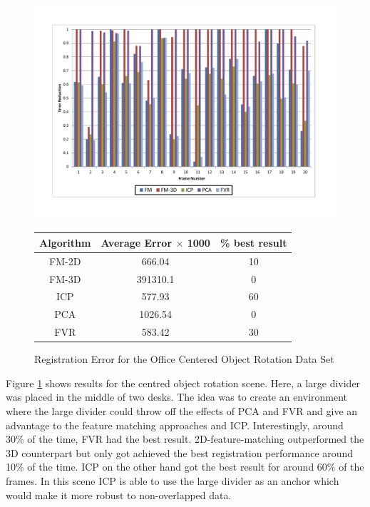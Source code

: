 \begin{figure}
\centering
\includegraphics[width=6in]{images/results/Office_Texture_blind_spot_rotation}
\caption{Registration Error for the Office Centered Object Rotation Data Set}
\label{fig:PET9}

\begin{tabular}{ccc}
\hline
\textbf{Algorithm} & \textbf{Average Error $\times$ 1000} & \textbf{\% best result}\\ \hline
FM-2D	& 666.04 & 10\\
FM-3D	& 391310.1 & 0\\
ICP		& 577.93 & 60\\
PCA		& 1026.54 & 0\\
FVR		& 583.42 & 30\\
\end{tabular}
\end{figure} 


Figure \ref{fig:PET9} shows results for the centred object rotation scene. Here, a large divider was placed in the middle of two desks. The idea was to create an environment where the large divider could throw off the effects of PCA and FVR and give an advantage to the feature matching approaches and ICP. Interestingly, around 30\% of the time, FVR had the best result. 2D-feature-matching outperformed the 3D counterpart but only got achieved the best registration performance around 10\% of the time. ICP on the other hand got the best result for around 60\% of the frames. In this scene ICP is able to use the large divider as an anchor which would make it more robust to non-overlapped data.


